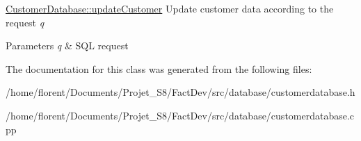 \hyperlink{classDatabases_1_1CustomerDatabase_a2ef9838798500e7ad4a09a3ed401fc8b}{Customer\-Database\-::update\-Customer} Update customer data according to the request {\itshape q} 


\begin{DoxyParams}{Parameters}
{\em q} & S\-Q\-L request \\
\hline
\end{DoxyParams}


The documentation for this class was generated from the following files\-:\begin{DoxyCompactItemize}
\item 
/home/florent/\-Documents/\-Projet\-\_\-\-S8/\-Fact\-Dev/src/database/customerdatabase.\-h\item 
/home/florent/\-Documents/\-Projet\-\_\-\-S8/\-Fact\-Dev/src/database/customerdatabase.\-cpp\end{DoxyCompactItemize}
